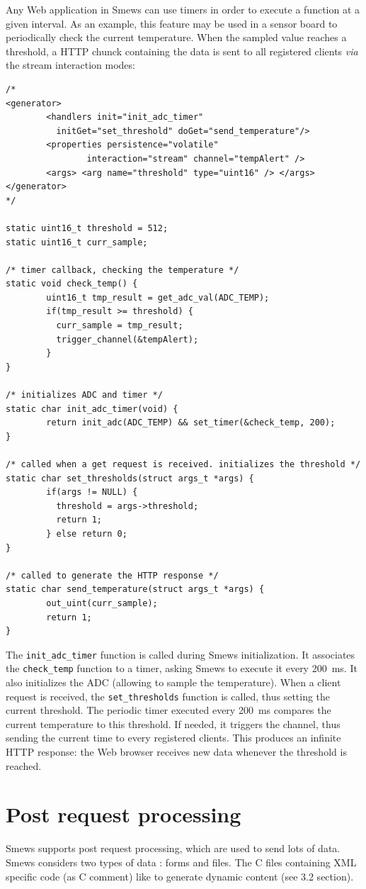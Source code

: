\documentclass{report}
\begin{document}
Any Web application in Smews can use timers in order to execute a function at a given interval. As an example, this feature may be used in a sensor board to periodically check the current temperature. When the sampled value reaches a threshold, a HTTP chunck containing the data is sent to all registered clients {\it via} the stream interaction modes:
\lstset{language=C}
\begin{lstlisting}
/*
<generator>
        <handlers init="init_adc_timer"
	      initGet="set_threshold" doGet="send_temperature"/>
        <properties persistence="volatile"
                interaction="stream" channel="tempAlert" />
        <args> <arg name="threshold" type="uint16" /> </args>
</generator>
*/

static uint16_t threshold = 512;
static uint16_t curr_sample;

/* timer callback, checking the temperature */
static void check_temp() {
        uint16_t tmp_result = get_adc_val(ADC_TEMP);
        if(tmp_result >= threshold) {
	      curr_sample = tmp_result;
	      trigger_channel(&tempAlert);
        }
}

/* initializes ADC and timer */
static char init_adc_timer(void) {
        return init_adc(ADC_TEMP) && set_timer(&check_temp, 200);
}

/* called when a get request is received. initializes the threshold */
static char set_thresholds(struct args_t *args) {
        if(args != NULL) {
	      threshold = args->threshold;
	      return 1;
        } else return 0;
}

/* called to generate the HTTP response */
static char send_temperature(struct args_t *args) {
        out_uint(curr_sample);
        return 1;
}
\end{lstlisting}

The \verb+init_adc_timer+ function is called during Smews initialization. It associates the \verb+check_temp+ function to a timer, asking Smews to execute it every 200~ms. It also initializes the ADC (allowing to sample the temperature). When a client request is received, the \verb+set_thresholds+ function is called, thus setting the current threshold. The periodic timer executed every 200~ms compares the current temperature to this threshold. If needed, it triggers the channel, thus sending the current time to every registered clients. This produces an infinite HTTP response: the Web browser receives new data whenever the threshold is reached.

\section{Post request processing}
Smews supports post request processing, which are used to send lots of data. Smews considers two types of data : forms and files. The C files containing XML specific code (as C comment) like to generate dynamic content (see 3.2 section).    
\end{document}
